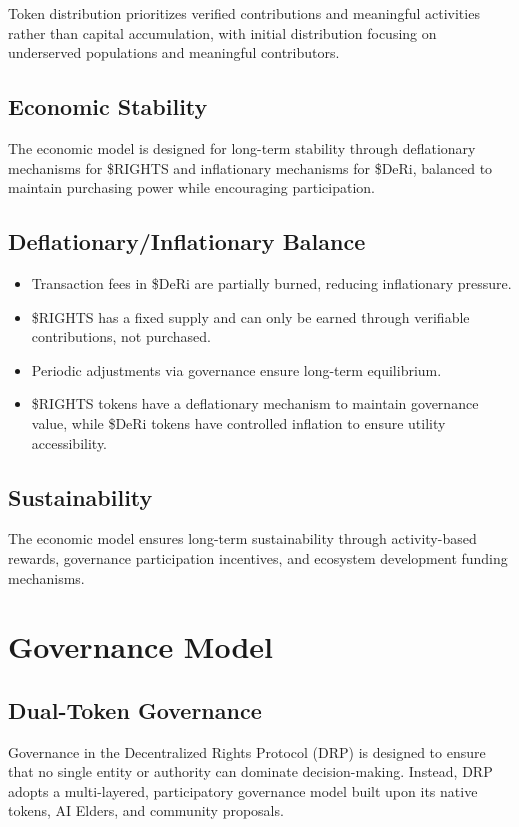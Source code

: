 \documentclass[11pt,a4paper]{article}
\begin{document}
Token distribution prioritizes verified contributions and meaningful activities rather than capital accumulation, with initial distribution focusing on underserved populations and meaningful contributors.

\subsection{Economic Stability}
The economic model is designed for long-term stability through deflationary mechanisms for \$RIGHTS and inflationary mechanisms for \$DeRi, balanced to maintain purchasing power while encouraging participation.

\subsection{Deflationary/Inflationary Balance}
\begin{itemize}
    \item Transaction fees in \$DeRi are partially burned, reducing inflationary pressure.
    \item \$RIGHTS has a fixed supply and can only be earned through verifiable contributions, not purchased.
    \item Periodic adjustments via governance ensure long-term equilibrium.
    \item \$RIGHTS tokens have a deflationary mechanism to maintain governance value, while \$DeRi tokens have controlled inflation to ensure utility accessibility.
\end{itemize}

\subsection{Sustainability}
The economic model ensures long-term sustainability through activity-based rewards, governance participation incentives, and ecosystem development funding mechanisms.


\section{Governance Model}

\subsection{Dual-Token Governance}
Governance in the Decentralized Rights Protocol (DRP) is designed to ensure that no single entity or authority can dominate decision-making. Instead, DRP adopts a multi-layered, participatory governance model built upon its native tokens, AI Elders, and community proposals.
\end{document}
